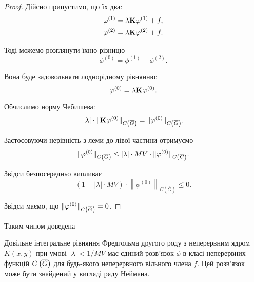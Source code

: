 \begin{proof}
	Дійсно припустимо, що їх два:
	\begin{equation}
		\begin{aligned}
			\phi^{(1)} &= \lambda \bf{K} \phi^{(1)} + f, \\
			\phi^{(2)} &= \lambda \bf{K} \phi^{(2)} + f.
		\end{aligned}
	\end{equation}

	Тоді можемо розглянути їхню різницю
	\begin{equation}
		\phi^{(0)} = \phi^{(1)} - \phi^{(2)}.
	\end{equation}

	Вона буде задовольняти лоднорідному рівнянню:
	\begin{equation}
		\phi^{(0)} = \lambda \bf{K} \phi^{(0)}.
	\end{equation}

	Обчислимо норму Чебишева:
	\begin{equation}
		|\lambda| \cdot \|\bf{K} \phi^{(0)}\|_{\CoG} = \| \phi^{(0)} \|_{\CoG}.
	\end{equation}

	Застосовуючи нерівність з леми до лівої частини отримуємо
	\begin{equation}
		\| \phi^{(0)} \|_{\CoG} \le |\lambda| \cdot MV \cdot \|\phi^{(0)}\|_{\CoG}.
	\end{equation}

	Звідси безпосередньо випливає
    \begin{equation}
        (1 - |\lambda| \cdot MV) \cdot \left\| \phi^{(0)} \right\|_{C\left(\overline{G}\right)} \le 0.
    \end{equation}

	Звідси маємо, що $\|\phi^{(0)}\|_{\CoG} = 0$.
\end{proof}

Таким чином доведена
\begin{theorem}
	Довільне інтегральне рівняння Фредгольма другого роду з неперервним ядром $K(x, y)$ при умові $|\lambda| < 1 / MV$ має єдиний розв'язок $\phi$ в класі неперервних функцій $\CoG$ для будь-якого неперервного вільного члена $f$. Цей роз\-в'я\-зок може бути знайдений у вигляді ряду Неймана.
\end{theorem}

